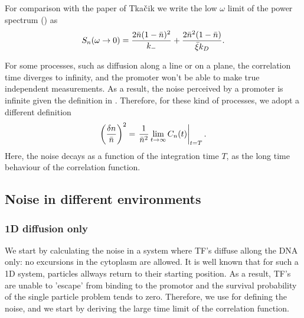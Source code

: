For comparison with the paper of Tka$\check{\rm c}$ik \cite{Tkacik2009} we write the low $\omega$ limit of the power spectrum () as
\begin{equation}
 S_n(\omega \to 0) = \frac{2 \bar{n}(1-\bar{n})^2}{k_-} + \frac{2\bar{n}^2(1-\bar{n})}{\bar{\xi} k_D}.
 \elabel{Sn}
\end{equation}

For some processes, such as diffusion along a line or on a plane, the correlation time diverges to infinity, and the promoter won't be able to make true independent measurements. As a result, the noise perceived by a promoter is infinite given the definition in . Therefore, for these kind of processes, we adopt a different definition
\begin{equation}
  \left( \frac{\delta n}{\bar{n}} \right)^2 = \left. \frac{1}{\bar{n}^2} \lim_{t \to \infty} C_n(t)  \right|_{t = T}.
  \elabel{EqProNoiseII}
\end{equation}
Here, the noise decays as a function of the integration time $T$, as the long time behaviour of the correlation function.


\subsection{Noise in different environments}

\subsubsection{1D diffusion only}
We start by calculating the noise in a system where TF's diffuse allong the DNA only: no excursions in the cytoplasm are allowed. It is well known \cite{Redner2001} that for such a 1D system, particles allways return to their starting position. As a result, TF's are unable to 'escape' from binding to the promotor and the survival probability of the single particle problem tends to zero. Therefore, we use  for defining the noise, and we start by deriving the large time limit of the correlation function.

